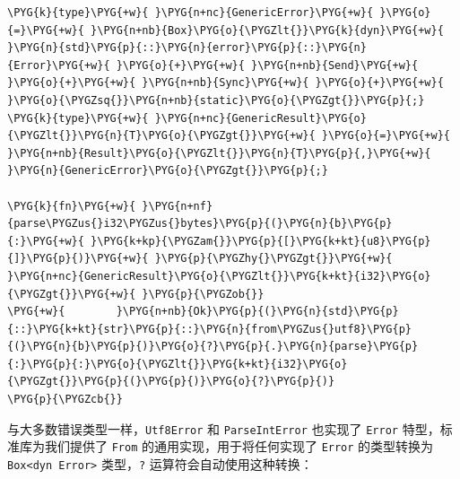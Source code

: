\begin{Verbatim}[commandchars=\\\{\},breaklines=true,breakanywhere=true,fontsize=\codefont,xleftmargin=17bp]
\PYG{k}{type}\PYG{+w}{ }\PYG{n+nc}{GenericError}\PYG{+w}{ }\PYG{o}{=}\PYG{+w}{ }\PYG{n+nb}{Box}\PYG{o}{\PYGZlt{}}\PYG{k}{dyn}\PYG{+w}{ }\PYG{n}{std}\PYG{p}{::}\PYG{n}{error}\PYG{p}{::}\PYG{n}{Error}\PYG{+w}{ }\PYG{o}{+}\PYG{+w}{ }\PYG{n+nb}{Send}\PYG{+w}{ }\PYG{o}{+}\PYG{+w}{ }\PYG{n+nb}{Sync}\PYG{+w}{ }\PYG{o}{+}\PYG{+w}{ }\PYG{o}{\PYGZsq{}}\PYG{n+nb}{static}\PYG{o}{\PYGZgt{}}\PYG{p}{;}
\PYG{k}{type}\PYG{+w}{ }\PYG{n+nc}{GenericResult}\PYG{o}{\PYGZlt{}}\PYG{n}{T}\PYG{o}{\PYGZgt{}}\PYG{+w}{ }\PYG{o}{=}\PYG{+w}{ }\PYG{n+nb}{Result}\PYG{o}{\PYGZlt{}}\PYG{n}{T}\PYG{p}{,}\PYG{+w}{ }\PYG{n}{GenericError}\PYG{o}{\PYGZgt{}}\PYG{p}{;}

\PYG{k}{fn}\PYG{+w}{ }\PYG{n+nf}{parse\PYGZus{}i32\PYGZus{}bytes}\PYG{p}{(}\PYG{n}{b}\PYG{p}{:}\PYG{+w}{ }\PYG{k+kp}{\PYGZam{}}\PYG{p}{[}\PYG{k+kt}{u8}\PYG{p}{]}\PYG{p}{)}\PYG{+w}{ }\PYG{p}{\PYGZhy{}\PYGZgt{}}\PYG{+w}{ }\PYG{n+nc}{GenericResult}\PYG{o}{\PYGZlt{}}\PYG{k+kt}{i32}\PYG{o}{\PYGZgt{}}\PYG{+w}{ }\PYG{p}{\PYGZob{}}
\PYG{+w}{        }\PYG{n+nb}{Ok}\PYG{p}{(}\PYG{n}{std}\PYG{p}{::}\PYG{k+kt}{str}\PYG{p}{::}\PYG{n}{from\PYGZus{}utf8}\PYG{p}{(}\PYG{n}{b}\PYG{p}{)}\PYG{o}{?}\PYG{p}{.}\PYG{n}{parse}\PYG{p}{:}\PYG{p}{:}\PYG{o}{\PYGZlt{}}\PYG{k+kt}{i32}\PYG{o}{\PYGZgt{}}\PYG{p}{(}\PYG{p}{)}\PYG{o}{?}\PYG{p}{)}
\PYG{p}{\PYGZcb{}}
\end{Verbatim}

与大多数错误类型一样，\texttt{Utf8Error} 和 \texttt{ParseIntError} 也实现了 \texttt{Error} 特型，标准库为我们提供了 \texttt{From} 的通用实现，用于将任何实现了 \texttt{Error} 的类型转换为 \texttt{Box<dyn Error>} 类型，\texttt{?} 运算符会自动使用这种转换：

